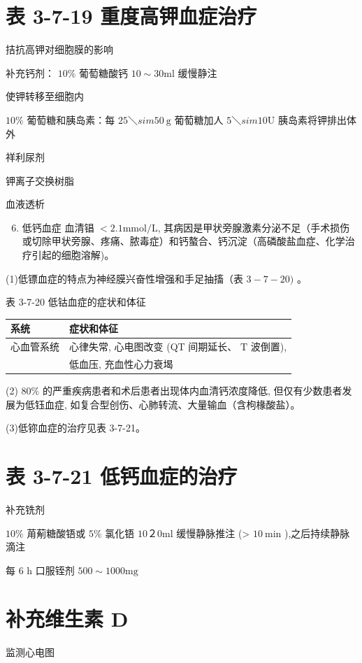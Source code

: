\documentclass[10pt]{article}
\begin{document}
\section*{表 3-7-19 重度高钾血症治疗}
拮抗高钾对细胞膜的影响

补充钙剂： $10 \%$ 葡萄糖酸钙 $10 \sim 30 \mathrm{ml}$ 缓慢静注

使钾转移至细胞内

$10 \%$ 葡萄糖和胰岛素：每 $25 ＼sim 50 \mathrm{~g}$ 葡萄糖加人 $5 ＼sim 10 \mathrm{U}$ 胰岛素将钾排出体外

祥利尿剂

钾离子交换树脂

血液透析

\begin{enumerate}
  \setcounter{enumi}{5}
  \item 低钙血症 血清锠 $<2.1 \mathrm{mmol} / \mathrm{L}$, 其病因是甲状旁腺激素分泌不足（手术损伤或切除甲状旁腺、疼痛、脓毒症）和钙螯合、钙沉淀（高磷酸盐血症、化学治疗引起的细胞溶解)。
\end{enumerate}

(1)低镖血症的特点为神经膜兴奋性增强和手足抽搐（表 $3-7-20)$ 。

表 3-7-20 低钴血症的症状和体征

\begin{center}
\begin{tabular}{ll}
\hline
系统 & 症状和体征 \\
\hline
心血管系统 & 心律失常, 心电图改变 (QT 间期延长、 $\mathrm{T}$ 波倒置), \\
 & 低血压, 充血性心力衰堨 \\
\end{tabular}
\end{center}

(2) $80 \%$ 的严重疾病患者和术后患者出现体内血清钙浓度降低, 但仅有少数患者发展为低钰血症, 如复合型创伤、心肺转流、大量输血（含枸椽酸盐）。

(3)低鿭血症的治疗见表 3-7-21。

\section*{表 3-7-21 低钙血症的治疗}
补充铣剂

$10 \%$ 苚葪糖酸铻或 $5 \%$ 氯化铻 $10 ２ 0 \mathrm{ml}$ 缓慢静脉推注 (> $10 \mathrm{~min}$ ),之后持续静脉滴注

每 6 h 口服铚剂 $500 \sim 1000 \mathrm{mg}$

\section*{补充维生素 D}
监测心电图
\end{document}
